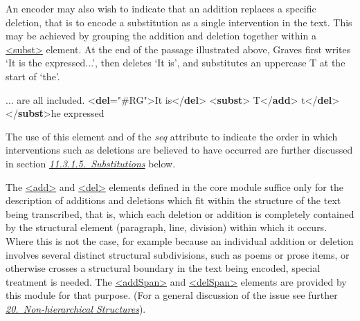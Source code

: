An encoder may also wish to indicate that an addition replaces a specific deletion, that is to encode a substitution as a single intervention in the text. This may be achieved by grouping the addition and deletion together within a \hyperref[TEI.subst]{<subst>} element. At the end of the passage illustrated above, Graves first writes ‘It is the expressed...’, then deletes ‘It is’, and substitutes an uppercase T at the start of ‘the’. \par\bgroup{}\exampleFont \begin{shaded}\noindent\mbox{} ... are all included. {<\textbf{del}\hspace*{1em}{hand}="{\#RG}">}It is{</\textbf{del}>}\mbox{}\newline 
{<\textbf{subst}>}\mbox{}\newline 
{}T{</\textbf{add}>}\mbox{}\newline 
{}t{</\textbf{del}>}\mbox{}\newline 
{</\textbf{subst}>}he expressed \end{shaded}\egroup\par \noindent  The use of this element and of the {\itshape seq} attribute to indicate the order in which interventions such as deletions are believed to have occurred are further discussed in section \textit{\hyperref[PHSU]{11.3.1.5.\ Substitutions}} below.\par
The \hyperref[TEI.add]{<add>} and \hyperref[TEI.del]{<del>} elements defined in the core module suffice only for the description of additions and deletions which fit within the structure of the text being transcribed, that is, which each deletion or addition is completely contained by the structural element (paragraph, line, division) within which it occurs. Where this is not the case, for example because an individual addition or deletion involves several distinct structural subdivisions, such as poems or prose items, or otherwise crosses a structural boundary in the text being encoded, special treatment is needed. The \hyperref[TEI.addSpan]{<addSpan>} and \hyperref[TEI.delSpan]{<delSpan>} elements are provided by this module for that purpose. (For a general discussion of the issue see further \textit{\hyperref[NH]{20.\ Non-hierarchical Structures}}).\par
